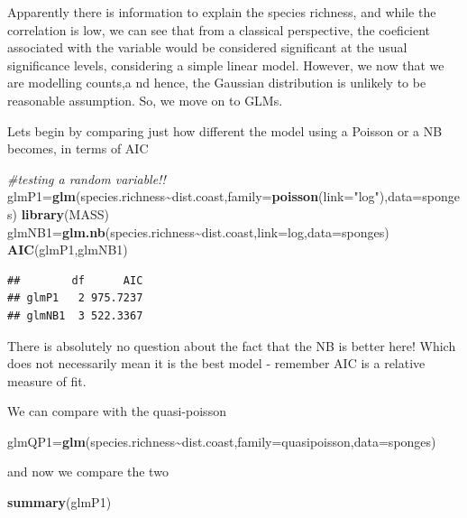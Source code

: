 \documentclass[
]{book}
\newenvironment{Shaded}{\begin{snugshade}}{\end{snugshade}}
\newcommand{\AttributeTok}[1]{\textcolor[rgb]{0.13,0.29,0.53}{#1}}
\newcommand{\CommentTok}[1]{\textcolor[rgb]{0.56,0.35,0.01}{\textit{#1}}}
\newcommand{\FunctionTok}[1]{\textcolor[rgb]{0.13,0.29,0.53}{\textbf{#1}}}
\newcommand{\NormalTok}[1]{#1}
\newcommand{\OtherTok}[1]{\textcolor[rgb]{0.56,0.35,0.01}{#1}}
\newcommand{\SpecialCharTok}[1]{\textcolor[rgb]{0.81,0.36,0.00}{\textbf{#1}}}
\newcommand{\StringTok}[1]{\textcolor[rgb]{0.31,0.60,0.02}{#1}}
\begin{document}
Apparently there is information to explain the species richness, and while the correlation is low, we can see that from a classical perspective, the coeficient associated with the variable would be considered significant at the usual significance levels, considering a simple linear model. However, we now that we are modelling counts,a nd hence, the Gaussian distribution is unlikely to be reasonable assumption. So, we move on to GLMs.

Lets begin by comparing just how different the model using a Poisson or a NB becomes, in terms of AIC

\begin{Shaded}
\begin{Highlighting}[]
\CommentTok{\#testing a random variable!!}
\NormalTok{glmP1}\OtherTok{=}\FunctionTok{glm}\NormalTok{(species.richness}\SpecialCharTok{\textasciitilde{}}\NormalTok{dist.coast,}\AttributeTok{family=}\FunctionTok{poisson}\NormalTok{(}\AttributeTok{link=}\StringTok{"log"}\NormalTok{),}\AttributeTok{data=}\NormalTok{sponges)}
\FunctionTok{library}\NormalTok{(MASS)}
\NormalTok{glmNB1}\OtherTok{=}\FunctionTok{glm.nb}\NormalTok{(species.richness}\SpecialCharTok{\textasciitilde{}}\NormalTok{dist.coast,}\AttributeTok{link=}\NormalTok{log,}\AttributeTok{data=}\NormalTok{sponges)}
\FunctionTok{AIC}\NormalTok{(glmP1,glmNB1)}
\end{Highlighting}
\end{Shaded}

\begin{verbatim}
##        df      AIC
## glmP1   2 975.7237
## glmNB1  3 522.3367
\end{verbatim}

There is absolutely no question about the fact that the NB is better here! Which does not necessarily mean it is the best model - remember AIC is a relative measure of fit.

We can compare with the quasi-poisson

\begin{Shaded}
\begin{Highlighting}[]
\NormalTok{glmQP1}\OtherTok{=}\FunctionTok{glm}\NormalTok{(species.richness}\SpecialCharTok{\textasciitilde{}}\NormalTok{dist.coast,}\AttributeTok{family=}\NormalTok{quasipoisson,}\AttributeTok{data=}\NormalTok{sponges)}
\end{Highlighting}
\end{Shaded}

and now we compare the two

\begin{Shaded}
\begin{Highlighting}[]
\FunctionTok{summary}\NormalTok{(glmP1)}
\end{Highlighting}
\end{Shaded}
\end{document}
